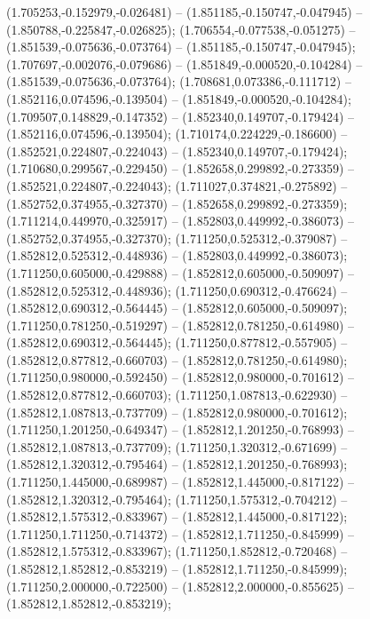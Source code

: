  (1.705253,-0.152979,-0.026481) -- (1.851185,-0.150747,-0.047945) -- (1.850788,-0.225847,-0.026825);
 (1.706554,-0.077538,-0.051275) -- (1.851539,-0.075636,-0.073764) -- (1.851185,-0.150747,-0.047945);
 (1.707697,-0.002076,-0.079686) -- (1.851849,-0.000520,-0.104284) -- (1.851539,-0.075636,-0.073764);
 (1.708681,0.073386,-0.111712) -- (1.852116,0.074596,-0.139504) -- (1.851849,-0.000520,-0.104284);
 (1.709507,0.148829,-0.147352) -- (1.852340,0.149707,-0.179424) -- (1.852116,0.074596,-0.139504);
 (1.710174,0.224229,-0.186600) -- (1.852521,0.224807,-0.224043) -- (1.852340,0.149707,-0.179424);
 (1.710680,0.299567,-0.229450) -- (1.852658,0.299892,-0.273359) -- (1.852521,0.224807,-0.224043);
 (1.711027,0.374821,-0.275892) -- (1.852752,0.374955,-0.327370) -- (1.852658,0.299892,-0.273359);
 (1.711214,0.449970,-0.325917) -- (1.852803,0.449992,-0.386073) -- (1.852752,0.374955,-0.327370);
 (1.711250,0.525312,-0.379087) -- (1.852812,0.525312,-0.448936) -- (1.852803,0.449992,-0.386073);
 (1.711250,0.605000,-0.429888) -- (1.852812,0.605000,-0.509097) -- (1.852812,0.525312,-0.448936);
 (1.711250,0.690312,-0.476624) -- (1.852812,0.690312,-0.564445) -- (1.852812,0.605000,-0.509097);
 (1.711250,0.781250,-0.519297) -- (1.852812,0.781250,-0.614980) -- (1.852812,0.690312,-0.564445);
 (1.711250,0.877812,-0.557905) -- (1.852812,0.877812,-0.660703) -- (1.852812,0.781250,-0.614980);
 (1.711250,0.980000,-0.592450) -- (1.852812,0.980000,-0.701612) -- (1.852812,0.877812,-0.660703);
 (1.711250,1.087813,-0.622930) -- (1.852812,1.087813,-0.737709) -- (1.852812,0.980000,-0.701612);
 (1.711250,1.201250,-0.649347) -- (1.852812,1.201250,-0.768993) -- (1.852812,1.087813,-0.737709);
 (1.711250,1.320312,-0.671699) -- (1.852812,1.320312,-0.795464) -- (1.852812,1.201250,-0.768993);
 (1.711250,1.445000,-0.689987) -- (1.852812,1.445000,-0.817122) -- (1.852812,1.320312,-0.795464);
 (1.711250,1.575312,-0.704212) -- (1.852812,1.575312,-0.833967) -- (1.852812,1.445000,-0.817122);
 (1.711250,1.711250,-0.714372) -- (1.852812,1.711250,-0.845999) -- (1.852812,1.575312,-0.833967);
 (1.711250,1.852812,-0.720468) -- (1.852812,1.852812,-0.853219) -- (1.852812,1.711250,-0.845999);
 (1.711250,2.000000,-0.722500) -- (1.852812,2.000000,-0.855625) -- (1.852812,1.852812,-0.853219);
